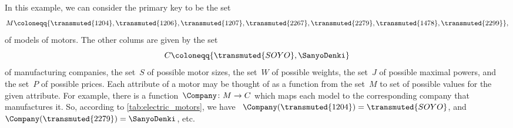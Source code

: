 \begin{comment}
    \begin{table}[h]
        \centering
        \begin{tabular}{c|c|c|c|c|c}
            Motor ID          & Company              & Size      & \unit[Weight]{[g]} & \unit[Max Power]{[W]} & \unit[price]{[USD]} \\
            \hline
            $\textsf{Model1}$ & Company $\textsf{B}$ & 2 x 3 x 4 & 10                 &                       & 259                 \\
            $\textsf{Model2}$ & Company $\textsf{A}$ & 2 x 3 x 4 & 20                 &                       & 109                 \\
            $\textsf{Model3}$ & Company $\textsf{B}$ & 2 x 3 x 4 & 5                  &                       & 124                 \\
            $\textsf{Model4}$ & Company $\textsf{C}$ & 2 x 3 x 4 & 30                 &                       & 399                 \\
            $\textsf{Model5}$ & Company $\textsf{A}$ & 2 x 3 x 4 & 45                 &                       & 245                 \\
            $\textsf{Model6}$ & Company $\textsf{D}$ & 2 x 3 x 4 & 20                 &                       & 89                  \\
            $\textsf{Model7}$ & Company $\textsf{B}$ & 2 x 3 x 4 & 15                 &                       & 130
        \end{tabular}
        \caption{A simplified catalogue of motors.}
        \label{tab:electric_motors}
    \end{table}
\end{comment}

In this example, we can consider the primary key to be the set
\begin{equation*}
    M \coloneqq \{ \transmuted{1204}, \transmuted{1206}, \transmuted{1207}, \transmuted{2267}, \transmuted{2279}, \transmuted{1478}, \transmuted{2299} \},
\end{equation*}
of models of motors. The other colums are given by the set
\begin{equation*}
    C \coloneqq \{ \transmuted{SOYO},\SanyoDenki\}
\end{equation*}
of manufacturing companies, the set~$S$ of possible motor sizes, the set~$W$ of possible weights, the set~$J$ of possible maximal powers, and the set~$P$ of possible prices. Each attribute of a motor may be thought of as a function from the set~$M$ to set of possible values for the given attribute. For example, there is a function~$\Company\colon M \to C$ which maps each model to the corresponding company that manufactures it. So, according to \cref{tab:electric_motors}, we have ~$\Company(\transmuted{1204}) = \transmuted{SOYO}$, and~$\Company(\transmuted{2279}) =\SanyoDenki$, etc.

